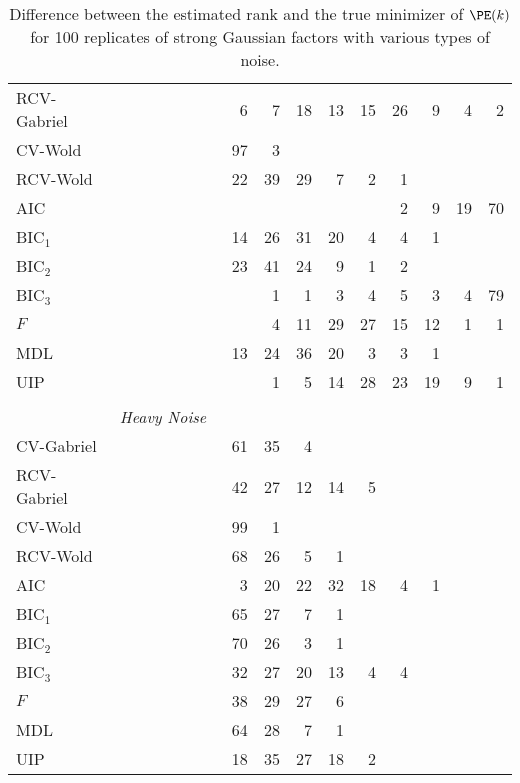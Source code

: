 \begin{table}
\begin{tabular}{lrrrrrrrrrrrrrrrr}
 RCV-Gabriel &  &  &  &  &  &  &  &  6 &  7 &  18 &  13 &  15 &  26 &  9 &  4 &  2\\ 
 CV-Wold &  &  &  &  &  &  &  &  97 &  3 &  &  &  &  &  &  & \\ 
 RCV-Wold &  &  &  &  &  &  &  &  22 &  39 &  29 &  7 &  2 &  1 &  &  & \\ 
 AIC &  &  &  &  &  &  &  &  &  &  &  &  &  2 &  9 &  19 &  70\\ 
 BIC$_1$ &  &  &  &  &  &  &  &  14 &  26 &  31 &  20 &  4 &  4 &  1 &  & \\ 
 BIC$_2$ &  &  &  &  &  &  &  &  23 &  41 &  24 &  9 &  1 &  2 &  &  & \\ 
 BIC$_3$ &  &  &  &  &  &  &  &  &  1 &  1 &  3 &  4 &  5 &  3 &  4 &  79\\ 
 $F$ &  &  &  &  &  &  &  &  &  4 &  11 &  29 &  27 &  15 &  12 &  1 &  1\\ 
 MDL &  &  &  &  &  &  &  &  13 &  24 &  36 &  20 &  3 &  3 &  1 &  & \\ 
 UIP &  &  &  &  &  &  &  &  &  1 &  5 &  14 &  28 &  23 &  19 &  9 &  1\\ 
        \\
        &\multicolumn{16}{l}{\scriptsize{\textit{Heavy Noise}}} \\
CV-Gabriel &  &  &  &  &  &  &  &  61 &  35 &  4 &  &  &  &  &  & \\ 
 RCV-Gabriel &  &  &  &  &  &  &  &  42 &  27 &  12 &  14 &  5 &  &  &  & \\ 
 CV-Wold &  &  &  &  &  &  &  &  99 &  1 &  &  &  &  &  &  & \\ 
 RCV-Wold &  &  &  &  &  &  &  &  68 &  26 &  5 &  1 &  &  &  &  & \\ 
 AIC &  &  &  &  &  &  &  &  3 &  20 &  22 &  32 &  18 &  4 &  1 &  & \\ 
 BIC$_1$ &  &  &  &  &  &  &  &  65 &  27 &  7 &  1 &  &  &  &  & \\ 
 BIC$_2$ &  &  &  &  &  &  &  &  70 &  26 &  3 &  1 &  &  &  &  & \\ 
 BIC$_3$ &  &  &  &  &  &  &  &  32 &  27 &  20 &  13 &  4 &  4 &  &  & \\ 
 $F$ &  &  &  &  &  &  &  &  38 &  29 &  27 &  6 &  &  &  &  & \\ 
 MDL &  &  &  &  &  &  &  &  64 &  28 &  7 &  1 &  &  &  &  & \\ 
 UIP &  &  &  &  &  &  &  &  18 &  35 &  27 &  18 &  2 &  &  &  & \\ 
        \bottomrule
    \end{tabular}
    \caption{
        Difference between the estimated rank and the true minimizer of 
        $\PE(k)$ for 100 replicates of strong Gaussian factors with various
        types of noise.
    }\label{T:rank-est-strong-gauss}
\end{table}

